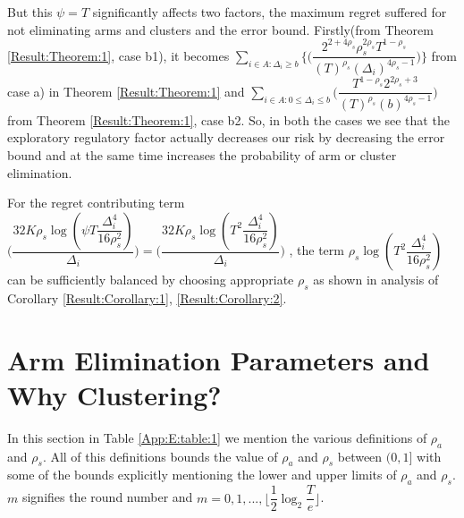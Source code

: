  But this $\psi=T$ significantly affects two factors, the maximum regret suffered for not eliminating arms and clusters and the error bound. Firstly(from Theorem \ref{Result:Theorem:1}, case b1), it becomes $ \sum_{i\in A:\Delta_{i}\geq b}\bigg\lbrace\bigg(\dfrac{2^{2+4\rho_{s}}\rho_{s}^{2\rho_{s}}T^{1-\rho_{s}}}{(T)^{\rho_{s}}(\Delta_{i})^{4\rho_{s}-1}}\bigg)\bigg\rbrace$ from case a) in Theorem \ref{Result:Theorem:1} and $\sum_{i\in A:0\leq \Delta_{i}\leq b} \bigg(\dfrac{T^{1-\rho_{s}}2^{2\rho_{s}+3}}{(T)^{\rho_{s}}(b)^{4\rho_{s} -1}} \bigg)$ from Theorem \ref{Result:Theorem:1}, case b2. So, in both the cases we see that the exploratory regulatory factor actually decreases our risk by decreasing the error bound and at the same time increases the probability of arm or cluster elimination.
	
 For the regret contributing term $\bigg(\dfrac{32K\rho_{s}\log{(\psi T\dfrac{\Delta_{i}^{4}}{16\rho_{s}^{2}})}}{\Delta_{i}}\bigg) = \bigg(\dfrac{32K\rho_{s}\log{(T^{2}\dfrac{\Delta_{i}^{4}}{16\rho_{s}^{2}})}}{\Delta_{i}}\bigg)$ , the term $\rho_{s}\log{(T^{2}\dfrac{\Delta_{i}^{4}}{16\rho_{s}^{2}})}$ can be sufficiently balanced by choosing appropriate $\rho_{s}$ as shown in analysis of Corollary \ref{Result:Corollary:1}, \ref{Result:Corollary:2}.

\section{Arm Elimination Parameters and Why Clustering?}
\label{App:E}
In this section in Table \ref{App:E:table:1} we mention the various definitions of $\rho_{a}$ and $\rho_{s}$. All of this definitions bounds the value of $\rho_{a}$ and $\rho_{s}$ between $(0,1]$ with some of the bounds explicitly mentioning the lower and upper limits of $\rho_{a}$ and $\rho_{s}$. $m$ signifies the round number and $m=0,1,...,\big \lfloor \dfrac{1}{2}\log_{2} \dfrac{T}{e}\big\rfloor$.

